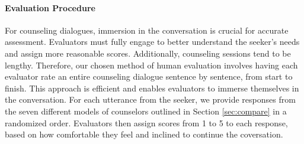 \paragraph{Evaluation Procedure} 
For counseling dialogues, immersion in the conversation is crucial for accurate assessment. Evaluators must fully engage to better understand the seeker's needs and assign more reasonable scores. Additionally, counseling sessions tend to be lengthy. Therefore, our chosen method of human evaluation involves having each evaluator rate an entire counseling dialogue sentence by sentence, from start to finish. This approach is efficient and enables evaluators to immerse themselves in the conversation. 
For each utterance from the seeker, we provide responses from the seven different models of counselors outlined in Section \ref{sec:compare} in a randomized order. Evaluators then assign scores from 1 to 5 to each response, based on how comfortable they feel and inclined to continue the coversation. %


\begin{table}[th]
    \centering
    \small
    \caption{Human-rated scores of responses generated by various counselor chatbots and human counselors. ``Satisfaction rate'' means the proportion of utterances scored 4 or 5 points by humans.}
    \label{tab:human}
\end{table}

